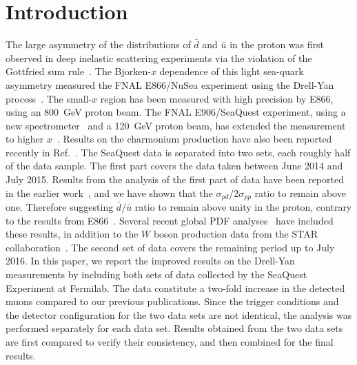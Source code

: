 \documentclass[reprint,aps,unsortedaddress,superscriptaddress,prl,floatfix,showpacs,linenumbers,final]{revtex4-2}
\begin{document}
\section{Introduction}
The large asymmetry of the distributions of $\bar{d}$ and $\bar{u}$ in the proton was first observed in deep inelastic
scattering experiments via the violation of the Gottfried sum rule~\cite{amaudruz1991}.
The Bjorken-$x$ dependence of this light sea-quark asymmetry measured the FNAL E866/NuSea
experiment using the Drell-Yan process~\cite{towell2001}.
The small-$x$ region has been measured with high precision by E866,
using an \SI{800}{\GeV} proton beam.
The FNAL E906/SeaQuest experiment, using a new spectrometer~\cite{aidala2019} and a \SI{120}{\GeV}
proton beam, has extended the measurement to higher $x$~\cite{dove2021,dove2023}.
Results on the charmonium production have also been reported recently in Ref.~\cite{leung2024a}.
The SeaQuest data is separated into two sets, each roughly half of the data sample.
The first part covers the data taken between June 2014 and July 2015.
Results from the analysis of the first part of data have been reported in the earlier work~\cite{dove2021,dove2023},
and we have shown that the $\sigma_{pd}/2\sigma_{pp}$ ratio to remain above one.
Therefore suggesting $\bar{d}/\bar{u}$ ratio to remain above unity in the proton,
contrary to the results from E866~\cite{towell2001}.
Several recent global PDF analyses~\cite{cocuzza2021,ball2022a,accardi2023,alekhin2023}
have included these results, in addition to the $W$ boson production data from the STAR collaboration~\cite{adam2021}.
The second set of data covers the remaining period up to July 2016.
In this paper, we report the improved results on the Drell-Yan measurements
by including both sets of data collected by the SeaQuest Experiment at Fermilab.
The data constitute a two-fold increase in the detected muons compared to our previous publications.
Since the trigger
conditions and the detector configuration for the two data sets are not
identical, the analysis was performed separately for each data set.
Results obtained from the two data sets are first compared to verify their
consistency, and then combined for the final results.
\end{document}
